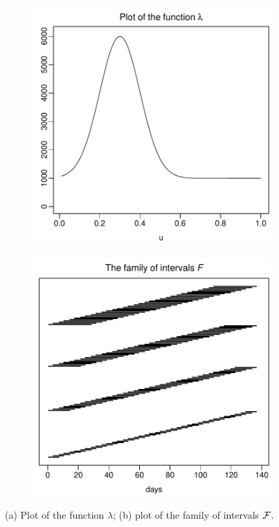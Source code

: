 \documentclass[a4paper,12pt]{article}
\numberwithin{equation}{section}
\begin{document}
\begin{figure}[t!]
\centering
\begin{subfigure}[b]{0.475\textwidth}
\includegraphics[width=\textwidth]{plots/lambda_fct}
\caption{}\label{fig:lambda}
\end{subfigure}\hspace{0.25cm}
\begin{subfigure}[b]{0.475\textwidth}
\includegraphics[width=\textwidth]{plots/all_intervals}
\caption{}\label{fig:intervals}
\end{subfigure}
\caption{(a) Plot of the function $\lambda$; (b) plot of the family of intervals $\mathcal{F}$.}\label{fig:lambda_F}
\end{figure}
\end{document}
